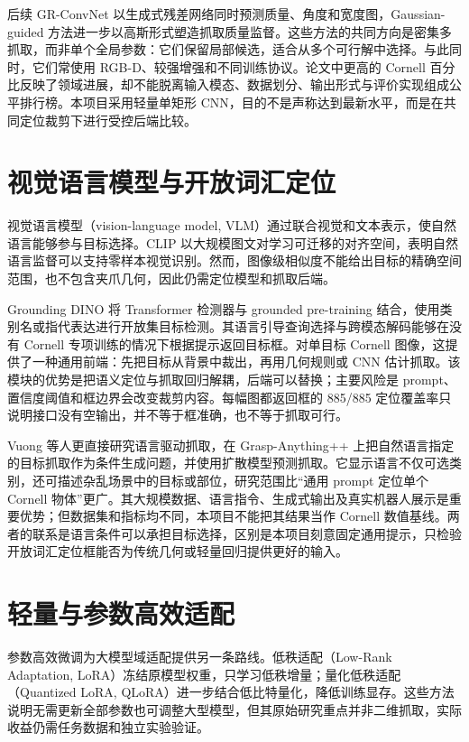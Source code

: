 \documentclass{l4proj}
\begin{document}
后续 GR-ConvNet 以生成式残差网络同时预测质量、角度和宽度图\citep{kumra2020antipodal}，Gaussian-guided 方法进一步以高斯形式塑造抓取质量监督\citep{li2022gaussian}。这些方法的共同方向是密集多抓取，而非单个全局参数：它们保留局部候选，适合从多个可行解中选择。与此同时，它们常使用 RGB-D、较强增强和不同训练协议。论文中更高的 Cornell 百分比反映了领域进展，却不能脱离输入模态、数据划分、输出形式与评价实现组成公平排行榜。本项目采用轻量单矩形 CNN，目的不是声称达到最新水平，而是在共同定位裁剪下进行受控后端比较。

\section{视觉语言模型与开放词汇定位}
视觉语言模型（vision-language model, VLM）通过联合视觉和文本表示，使自然语言能够参与目标选择。CLIP 以大规模图文对学习可迁移的对齐空间，表明自然语言监督可以支持零样本视觉识别\citep{radford2021learning}。然而，图像级相似度不能给出目标的精确空间范围，也不包含夹爪几何，因此仍需定位模型和抓取后端。

Grounding DINO 将 Transformer 检测器与 grounded pre-training 结合，使用类别名或指代表达进行开放集目标检测\citep{liu2023grounding}。其语言引导查询选择与跨模态解码能够在没有 Cornell 专项训练的情况下根据提示返回目标框。对单目标 Cornell 图像，这提供了一种通用前端：先把目标从背景中裁出，再用几何规则或 CNN 估计抓取。该模块的优势是把语义定位与抓取回归解耦，后端可以替换；主要风险是 prompt、置信度阈值和框边界会改变裁剪内容。每幅图都返回框的 885/885 定位覆盖率只说明接口没有空输出，并不等于框准确，也不等于抓取可行。

Vuong 等人更直接研究语言驱动抓取，在 Grasp-Anything++ 上把自然语言指定的目标抓取作为条件生成问题，并使用扩散模型预测抓取\citep{vuong2024language}。它显示语言不仅可选类别，还可描述杂乱场景中的目标或部位，研究范围比“通用 prompt 定位单个 Cornell 物体”更广。其大规模数据、语言指令、生成式输出及真实机器人展示是重要优势；但数据集和指标均不同，本项目不能把其结果当作 Cornell 数值基线。两者的联系是语言条件可以承担目标选择，区别是本项目刻意固定通用提示，只检验开放词汇定位框能否为传统几何或轻量回归提供更好的输入。

\section{轻量与参数高效适配}
参数高效微调为大模型域适配提供另一条路线。低秩适配（Low-Rank Adaptation, LoRA）冻结原模型权重，只学习低秩增量\citep{hu2021lora}；量化低秩适配（Quantized LoRA, QLoRA）进一步结合低比特量化，降低训练显存\citep{dettmers2023qlora}。这些方法说明无需更新全部参数也可调整大型模型，但其原始研究重点并非二维抓取，实际收益仍需任务数据和独立实验验证。
\end{document}
